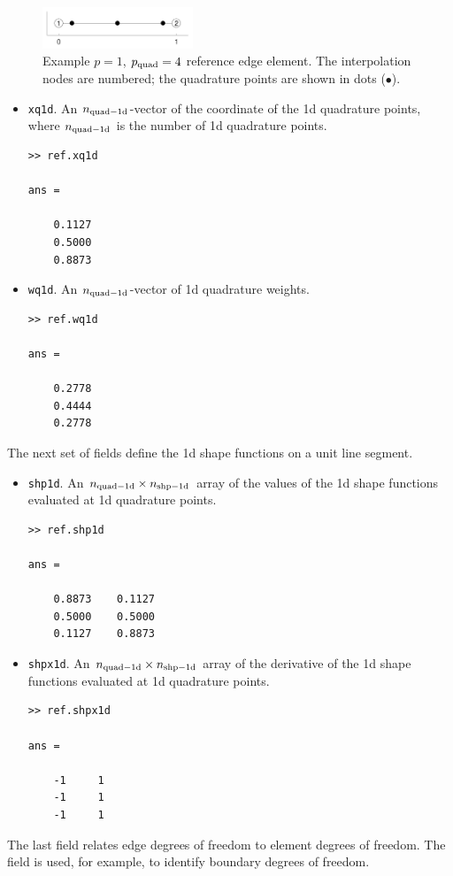 \documentclass[openany,preprint,11pt]{article}
\begin{document}
\begin{figure}[!h]
  \centering
  \includegraphics[width=0.4\textwidth]{ref_p1_1d}
  \caption{Example $p=1$, $p_{\rm quad} = 4$ reference edge element.  The interpolation nodes are numbered; the quadrature points are shown in dots ($\bullet$).}
\end{figure}
\begin{itemize}
\item \texttt{xq1d}. An $n_{\rm quad-1d}$-vector of the coordinate of the 1d quadrature points, where $n_{\rm quad-1d}$ is the number of 1d quadrature points.
\begin{verbatim}
>> ref.xq1d

ans =

    0.1127
    0.5000
    0.8873
\end{verbatim}
\item \texttt{wq1d}. An $n_{\rm quad-1d}$-vector of 1d quadrature weights.
\begin{verbatim}
>> ref.wq1d

ans =

    0.2778
    0.4444
    0.2778
\end{verbatim}
\end{itemize}
The next set of fields define the 1d shape functions on a unit line segment. 
\begin{itemize}
\item \texttt{shp1d}. An $n_{\rm quad-1d} \times n_{\rm shp-1d}$ array of the values of the 1d shape functions evaluated at 1d quadrature points.
\begin{verbatim}
>> ref.shp1d

ans =

    0.8873    0.1127
    0.5000    0.5000
    0.1127    0.8873
\end{verbatim}
\item \texttt{shpx1d}. An $n_{\rm quad-1d} \times n_{\rm shp-1d}$ array of the derivative of the 1d shape functions evaluated at 1d quadrature points.
\begin{verbatim}
>> ref.shpx1d

ans =

    -1     1
    -1     1
    -1     1
\end{verbatim}
\end{itemize}
The last field relates edge degrees of freedom to element degrees of freedom.  The field is used, for example, to identify boundary degrees of freedom.
\end{document}
